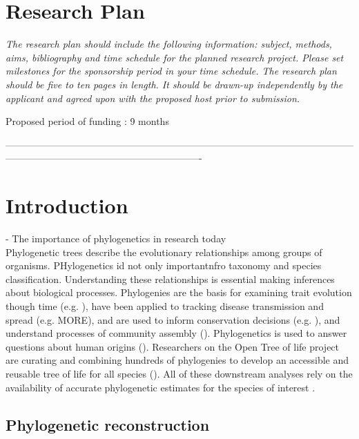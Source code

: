 \documentclass[10pt]{article}
\begin{document}
\section*{Research Plan}                   

\textsl{The research plan should include the following information: subject, methods, aims, bibliography and time schedule for the planned research project. Please set milestones for the sponsorship period in your time schedule.
The research plan should be five to ten pages in length.
It should be drawn-up independently by the applicant and agreed upon with the proposed host prior to submission.}

Proposed period of funding : 9 months


-------------------------------------------------------------------------------------------------------------------------------------------------------------------------
\section*{Introduction}
  - The importance of phylogenetics in research today\\
Phylogenetic trees describe the evolutionary relationships among groups of organisms. PHylogenetics id not only importantnfro taxonomy and species classification. Understanding these relationships is essential making inferences about biological processes. Phylogenies are the basis for examining trait evolution though time (e.g. \cite{omeara_testing_2006}), have been applied to tracking disease transmission and spread (e.g. \cite{timme_phylogenetic_2013} MORE), and are used to inform conservation decisions (e.g. \cite{isaac_mammals_2007}), and understand processes of community assembly (\cite{emerson_phylogenetic_2008}). Phylogenetics is used to answer questions about human origins (\cite{endicott_using_2010}). Researchers on the Open Tree of life project are curating and combining hundreds of phylogenies to develop an accessible and reusable tree of life for all species (\cite{drew_lost_2013}). All of these downstream analyses rely on the availability of accurate phylogenetic estimates for the species of interest \cite{stoltzfus_phylotastic!_2013}.


\subsection*{Phylogenetic reconstruction}
\end{document}
